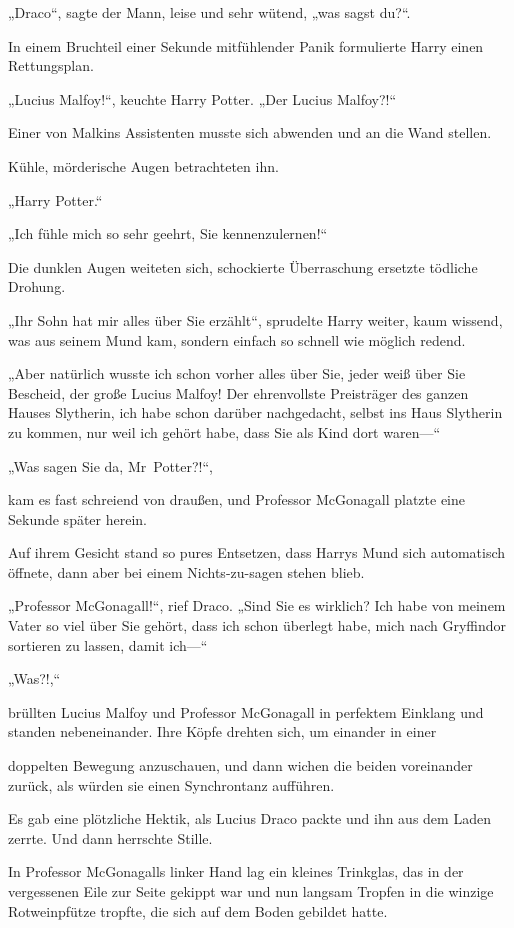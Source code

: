 {„Draco“, sagte der Mann, leise und sehr wütend, „was sagst du?“.

In einem Bruchteil einer Sekunde mitfühlender Panik formulierte Harry einen Rettungsplan.

„Lucius Malfoy!“, keuchte Harry Potter. „Der Lucius Malfoy?!“

Einer von Malkins Assistenten musste sich abwenden und an die Wand stellen.

Kühle, mörderische Augen betrachteten ihn.

„Harry Potter.“

„Ich fühle mich so sehr geehrt, Sie kennenzulernen!“

Die dunklen Augen weiteten sich, schockierte Überraschung ersetzte tödliche Drohung.

„Ihr Sohn hat mir alles über Sie erzählt“, sprudelte Harry weiter, kaum wissend, was aus seinem Mund kam, sondern einfach so schnell wie möglich redend.

„Aber natürlich wusste ich schon vorher alles über Sie, jeder weiß über Sie Bescheid, der große Lucius Malfoy! Der ehrenvollste Preisträger des ganzen Hauses Slytherin, ich habe schon darüber nachgedacht, selbst ins Haus Slytherin zu kommen, nur weil ich gehört habe, dass Sie als Kind dort waren—“

„Was sagen Sie da, Mr~Potter?!“,

kam es fast schreiend von draußen, und Professor McGonagall platzte eine Sekunde später herein.

Auf ihrem Gesicht stand so pures Entsetzen, dass Harrys Mund sich automatisch öffnete, dann aber bei einem Nichts-zu-sagen stehen blieb.

„Professor McGonagall!“, rief Draco. „Sind Sie es wirklich? Ich habe von meinem Vater so viel über Sie gehört, dass ich schon überlegt habe, mich nach Gryffindor sortieren zu lassen, damit ich—“

„Was?!,“

brüllten Lucius Malfoy und Professor McGonagall in perfektem Einklang und standen nebeneinander. Ihre Köpfe drehten sich, um einander in einer

doppelten Bewegung anzuschauen, und dann wichen die beiden voreinander zurück, als würden sie einen Synchrontanz aufführen.

Es gab eine plötzliche Hektik, als Lucius Draco packte und ihn aus dem Laden zerrte. Und dann herrschte Stille.

In Professor McGonagalls linker Hand lag ein kleines Trinkglas, das in der vergessenen Eile zur Seite gekippt war und nun langsam Tropfen in die winzige Rotweinpfütze tropfte, die sich auf dem Boden gebildet hatte.

}
